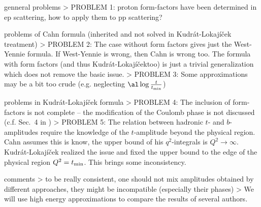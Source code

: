\def\KL{Kudr\' at-Lokaj\' i\v cek}
\def\KaL{Kudr\' at and Lokaj\' i\v cek}
\def\WY{West-Yennie}
\def\WaY{West and Yennie}

\> genneral problems
\>> PROBLEM 1: proton form-factors have been determined in ep scattering, how to apply them to pp scattering?

\> problems of Cahn formula (inherited and not solved in \KL{} treatment)
\>> PROBLEM 2: The case without form factors gives just the \WY{} formula. If \WY{} is wrong, then Cahn is wrong too. The formula with form factors (and thus \KL too) is just a trivial generalization which does not remove the basic issue.
\>> PROBLEM 3: Some approximations may be a bit too crude (e.g. neglecting $\al \log {t\over t_{\rm min}}$)

\> problems in \KL{} formula
\>> PROBLEM 4: The inclusion of form-factors is not complete -- the modification of the Coulomb phase is not discussed (c.f. Sec.~4 in )
\>> PROBLEM 5: The relation between hadronic $t$- and $b$-amplitudes require the knowledge of the $t$-amplitude beyond the physical region. Cahn assumes this is know, the upper bound of his $q^2$-integrals is $Q^2\to\infty$. \KL{} realized the issue and fixed the upper bound to the edge of the physical region $Q^2 = t_{\rm min}$. This brings some inconsistency.

\> comments
\>> to be really consistent, one should not mix amplitudes obtained by different approaches, they might be incompatible (especially their phases) 
\>> We will use high energy approximations to compare the results of several authors.

\vskip1cm

\iffalse
Out of the four fundamental forces, only two are important for forward scattering of protons, namely strong and electromagnetic. The gravitational force is too weak and the weak force has a negligible contribution only (\TODO{suppressed by the mass of its bosons}).

Bethe derived \bref{bethe58}
\eqref{F^{C+H}(t) = F^C(t) e^{i \al \Ph(t)} + F^H(t)}{el FCH decomp}
with the Coulomb-hadronic phase $\Phi$
\eqref{\Phi_{\rm Bethe}(t) = 2 \log {1.06\over a\sqrt{t}}}{el phase bethe}
\TODO{explain}
\fi

